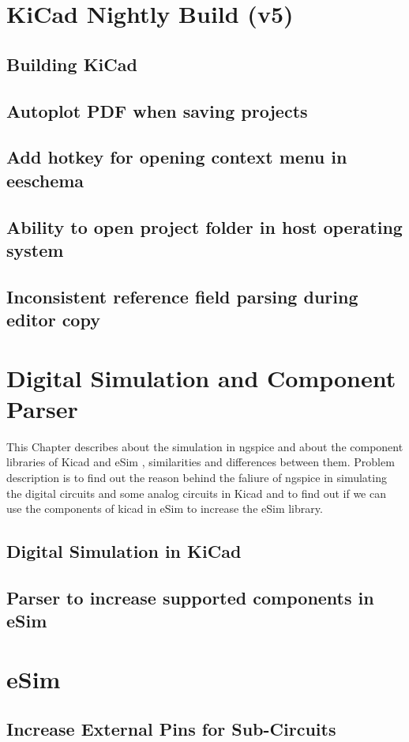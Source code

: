 \documentclass[12pt,a4paper]{report}
\begin{document}
\chapter{\textbf{KiCad Nightly Build (v5)}}
\section{Building KiCad} 
\section{Autoplot PDF when saving projects}
\section{Add hotkey for opening context menu in eeschema}
\section{Ability to open project folder in host operating system}
\section{Inconsistent reference field parsing during editor copy}


\chapter{\textbf{Digital Simulation and Component Parser}}
This Chapter describes about the simulation in ngspice and about the component libraries of Kicad and eSim , similarities and differences between them. Problem description is to find out the reason behind the faliure of ngspice in simulating the digital circuits and some analog circuits in Kicad and to find out if we can use the components of kicad in eSim to increase the eSim library.
\section{Digital Simulation in KiCad}
\section{Parser to increase supported components in eSim}


\chapter{\textbf{eSim}}
\section{Increase External Pins for Sub-Circuits}
\end{document}
